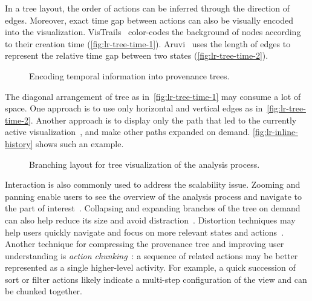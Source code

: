 In a tree layout, the order of actions can be inferred through the direction of edges. Moreover, exact time gap between actions can also be visually encoded into the visualization. VisTrails~\cite{Bavoil2005} color-codes the background of nodes according to their creation time (\autoref{fig:lr-tree-time-1}). Aruvi~\cite{Shrinivasan2008} uses the length of edges to represent the relative time gap between two states (\autoref{fig:lr-tree-time-2}).

\begin{figure}
\centering
{}
\hfill
{}
\caption{Encoding temporal information into provenance trees.}
\end{figure}

The diagonal arrangement of tree as in~\autoref{fig:lr-tree-time-1} may consume a lot of space. One approach is to use only horizontal and vertical edges as in~\autoref{fig:lr-tree-time-2}. Another approach is to display only the path that led to the currently active  visualization~\cite{Klemmer2002}, and make other paths expanded on demand. \autoref{fig:lr-inline-history} shows such an example.

\begin{figure}
\centering
{}
\hfill
{}
\caption[Branching layout for tree visualization of the analysis process]{Branching layout for tree visualization of the analysis process. }
\label{fig:lr-inline-history}
\end{figure}

Interaction is also commonly used to address the scalability issue. Zooming and panning enable users to see the overview of the analysis process and navigate to the part of interest~\cite{Dunne2012}. Collapsing and expanding branches of the tree on demand can also help reduce its size and avoid distraction~\cite{Bavoil2005}. Distortion techniques may help users quickly navigate and focus on more relevant states and actions~\cite{Meng1998}. Another technique for compressing the provenance tree and improving user understanding is \emph{action chunking}~\cite{Heer2008}: a sequence of related actions may be better represented as a single higher-level activity. For example, a quick succession of sort or filter actions likely indicate a multi-step configuration of the view and can be chunked together.

